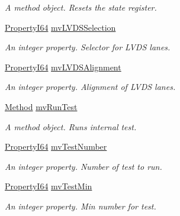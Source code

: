 \begin{DoxyCompactItemize}
\begin{DoxyCompactList}\small\item\em A method object. Resets the state register. \end{DoxyCompactList}\item 
\hyperlink{group___common_interface_ga81749b2696755513663492664a18a893}{Property\+I64} \hyperlink{classmv_i_m_p_a_c_t_1_1acquire_1_1_gen_i_cam_1_1mv_custom_data_a6e0385f0f57513855062f803e603e161}{mv\+L\+V\+D\+S\+Selection}
\begin{DoxyCompactList}\small\item\em An integer property. Selector for L\+V\+D\+S lanes. \end{DoxyCompactList}\item 
\hyperlink{group___common_interface_ga81749b2696755513663492664a18a893}{Property\+I64} \hyperlink{classmv_i_m_p_a_c_t_1_1acquire_1_1_gen_i_cam_1_1mv_custom_data_a801128023b93fb6800ae326a52afd269}{mv\+L\+V\+D\+S\+Alignment}
\begin{DoxyCompactList}\small\item\em An integer property. Alignment of L\+V\+D\+S lanes. \end{DoxyCompactList}\item 
\hyperlink{classmv_i_m_p_a_c_t_1_1acquire_1_1_method}{Method} \hyperlink{classmv_i_m_p_a_c_t_1_1acquire_1_1_gen_i_cam_1_1mv_custom_data_a1969a4d011dcf1246c25ef7ef4fb18ab}{mv\+Run\+Test}
\begin{DoxyCompactList}\small\item\em A method object. Runs internal test. \end{DoxyCompactList}\item 
\hyperlink{group___common_interface_ga81749b2696755513663492664a18a893}{Property\+I64} \hyperlink{classmv_i_m_p_a_c_t_1_1acquire_1_1_gen_i_cam_1_1mv_custom_data_adf62e01c9c4f54ddb61249cb6168d328}{mv\+Test\+Number}
\begin{DoxyCompactList}\small\item\em An integer property. Number of test to run. \end{DoxyCompactList}\item 
\hyperlink{group___common_interface_ga81749b2696755513663492664a18a893}{Property\+I64} \hyperlink{classmv_i_m_p_a_c_t_1_1acquire_1_1_gen_i_cam_1_1mv_custom_data_abd5c6eceb9868f2d2e809752f3de121e}{mv\+Test\+Min}
\begin{DoxyCompactList}\small\item\em An integer property. Min number for test. \end{DoxyCompactList}\item 

\end{DoxyCompactItemize}
